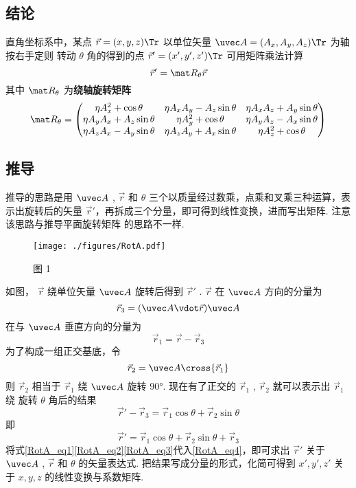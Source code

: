 \subsection{结论}
直角坐标系中，某点 $\vec r=(x,y,z)\Tr$ 以单位矢量 $\uvec A=({A_x},{A_y},{A_z})\Tr$ 为轴按右手定则%
转动 $\theta$ 角的得到的点 $\vec r'=(x',y',z')\Tr$ 可用矩阵乘法计算
\begin{equation}
\vec r' = {\mat R_\theta }\vec r
\end{equation}
其中 $\mat R_\theta$ 为\textbf{绕轴旋转矩阵}
\begin{equation}
\mat R_\theta =
\begin{pmatrix}
\eta A_x^2 + \cos\theta & \eta A_x A_y - A_z\sin\theta & \eta A_x A_z + A_y\sin\theta\\
\eta A_y A_x + A_z\sin\theta & \eta A_y^2 + \cos\theta & \eta A_y A_z - A_x\sin\theta\\
\eta A_z A_x - A_y \sin\theta & \eta A_z A_y + A_x\sin\theta & \eta A_z^2 + \cos\theta
\end{pmatrix}\end{equation}

\subsection{推导}
推导的思路是用 $\uvec A$ , $\vec r$ 和 $\theta $ 三个以质量经过数乘，点乘和叉乘三种运算，表示出旋转后的矢量 $\vec r'$，再拆成三个分量，即可得到线性变换，进而写出矩阵. 注意该思路与推导平面旋转矩阵 的思路不一样.
\begin{figure}[h]
\centering
\texttt{[image: ./figures/RotA.pdf]}
\caption{图 1}
\end{figure} 

如图， $\vec r$ 绕单位矢量 $\uvec A$ 旋转后得到 $\vec r'$ .  $\vec r$ 在 $\uvec A$ 方向的分量为   
\begin{equation}\label{RotA_eq1}
{\vec r_3} = (\uvec A \vdot \vec r)\uvec A
\end{equation}
 在与 $\uvec A$ 垂直方向的分量为
\begin{equation}\label{RotA_eq2}
{\vec r_1} = \vec r - {\vec r_3}
\end{equation}
 为了构成一组正交基底，令
 \begin{equation}\label{RotA_eq3}
{\vec r_2} = \uvec A \cross {\vec r_1}
\end{equation}
则 ${\vec r_2}$ 相当于 ${\vec r_1}$ 绕 $\uvec A$ 旋转 90°. 现在有了正交的 ${\vec r_1}$ , ${\vec r_2}$  就可以表示出 ${\vec r_1}$ 绕 旋转 $\theta $ 角后的结果
\begin{equation}
\vec r' - {\vec r_3} = {\vec r_1}\cos \theta  + {\vec r_2}\sin \theta
\end{equation}
即
\begin{equation}\label{RotA_eq4}
\vec r' = {\vec r_1}\cos \theta  + {\vec r_2}\sin \theta  + {\vec r_3}
\end{equation} 
将式\eqref{RotA_eq1}\eqref{RotA_eq2}\eqref{RotA_eq3}代入\eqref{RotA_eq4}，即可求出 $\vec r'$ 关于 $\uvec A$ , $\vec r$ 和 $\theta $ 的矢量表达式. 把结果写成分量的形式，化简可得到 $x',y',z'$ 关于 $x,y,z$ 的线性变换与系数矩阵.

